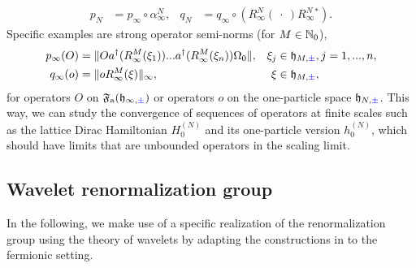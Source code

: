 \documentclass[a4paper, 11pt]{article}
\newcommand{\ua}{\textup a}
\newcommand{\fF}{\mathfrak{F}}\newcommand{\cF}{\mathcal{F}}\newcommand{\dF}{\mathds{F}}\newcommand{\sF}{\mathscr{F}}
\newcommand{\fh}{\mathfrak{h}}
\DeclareMathOperator{\1}{\mathds{1}}
\begin{document}
\begin{align}
\label{eq:snind}
p_{N} & = p_{\infty}\circ\alpha^{N}_{\infty}, & q_{N} & = q_{\infty}\circ(R^{N}_{\infty}(\!\ \cdot\!\ )R^{N}_{\infty}{}^{*}).
\end{align}
Specific examples are strong operator semi-norms (for $M\in\mathbb{N}_{0}$),
\begin{align}
\label{eq:snex}
p_{\infty}(O) & = \|Oa^{\dag}(R^{M}_{\infty}(\xi_{1}))...a^{\dag}(R^{M}_{\infty}(\xi_{n}))\Omega_{0}\|, & \xi_{j} & \in\fh_{M,{\color{blue}\pm}}, j=1,...,n, \\ \nonumber
q_{\infty}(o) & = \|oR^{M}_{\infty}(\xi)\|_{\infty}, & \xi & \in\fh_{M,{\color{blue}\pm}}, 
\end{align}
for operators $O$ on $\fF_{\ua}(\fh_{\infty,{\color{blue}\pm}})$ or operators $o$ on the one-particle space $\fh_{N,{\color{blue}\pm}}$. This way, we can study the convergence of sequences of operators at finite scales such as the lattice Dirac Hamiltonian $H^{(N)}_{0}$ and its one-particle version $h^{(N)}_{0}$, which should have limits  that are unbounded operators in the scaling limit.

\subsection{Wavelet renormalization group}
\label{sec:waveletrg}
In the following, we make use of a specific realization of the renormalization group using the theory of wavelets by adapting the constructions in \cite{MorinelliScalingLimitsOf} to the fermionic setting.
\end{document}
